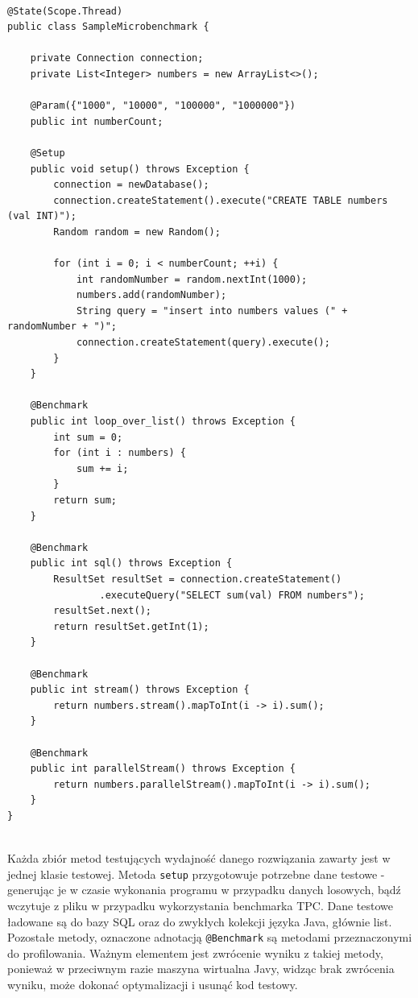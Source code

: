 \documentclass[12pt]{extarticle}
\begin{document}
\begin{lstlisting}[label=testclass, caption=Przykładowa klasa JMH]

@State(Scope.Thread)
public class SampleMicrobenchmark {
    
    private Connection connection;
    private List<Integer> numbers = new ArrayList<>();
    
    @Param({"1000", "10000", "100000", "1000000"})
    public int numberCount;
    
    @Setup
    public void setup() throws Exception {
        connection = newDatabase();
        connection.createStatement().execute("CREATE TABLE numbers (val INT)");
        Random random = new Random();
        
        for (int i = 0; i < numberCount; ++i) {
            int randomNumber = random.nextInt(1000);
            numbers.add(randomNumber);
            String query = "insert into numbers values (" + randomNumber + ")";
            connection.createStatement(query).execute();
        }
    }
    
    @Benchmark
    public int loop_over_list() throws Exception {
        int sum = 0;
        for (int i : numbers) {
            sum += i;
        }
        return sum;
    }
    
    @Benchmark
    public int sql() throws Exception {
        ResultSet resultSet = connection.createStatement()
                .executeQuery("SELECT sum(val) FROM numbers");
        resultSet.next();
        return resultSet.getInt(1);
    }
    
    @Benchmark
    public int stream() throws Exception {
        return numbers.stream().mapToInt(i -> i).sum();
    }
    
    @Benchmark
    public int parallelStream() throws Exception {
        return numbers.parallelStream().mapToInt(i -> i).sum();
    }
}


\end{lstlisting}

    Każda zbiór metod testujących wydajność danego rozwiązania zawarty jest w jednej klasie testowej. Metoda \texttt{setup} przygotowuje potrzebne dane testowe - generując je w czasie wykonania programu w przypadku danych losowych, bądź wczytuje z pliku w przypadku wykorzystania benchmarka TPC. Dane testowe ładowane są do bazy SQL oraz do zwykłych kolekcji języka Java, głównie list. Pozostałe metody, oznaczone adnotacją \texttt{@Benchmark} są metodami przeznaczonymi do profilowania. Ważnym elementem jest zwrócenie wyniku z takiej metody, ponieważ w przeciwnym razie maszyna wirtualna Javy, widząc brak zwrócenia wyniku, może dokonać optymalizacji i usunąć kod testowy.


\clearpage\mbox{}\clearpage
\clearpage\mbox{}\clearpage
\end{document}
